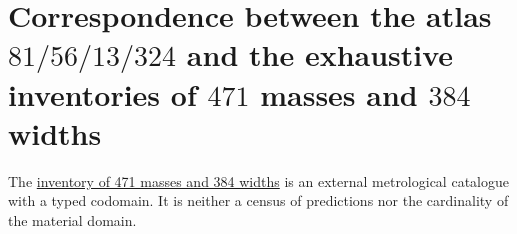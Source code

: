 \section{Correspondence between the atlas \(81/56/13/324\) and the exhaustive inventories of \(471\) masses and \(384\) widths}
\label{chap:portal-atlas-inventarios-masas}
The \hyperref[chap:inventario-universal-471-masas-384-anchuras]{inventory of
471 masses and 384 widths} is an external metrological catalogue with a typed codomain. It is neither a census of predictions nor the cardinality of the material domain.
